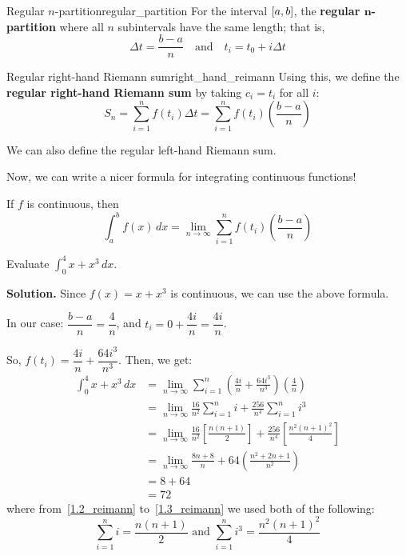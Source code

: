 \begin{Definition}{Regular $n$-partition}{regular_partition}
    For the interval $ \interval{a}{b} $, the \textbf{regular $ \bm{n} $-partition}
    where all $ n $ subintervals
    have the same length; that is,
    \[ \Delta t=\frac{b-a}{n} \quad\text{and}\quad  t_i=t_0+i\Delta t \]
\end{Definition}

\begin{Definition}{Regular right-hand Riemann sum}{right_hand_reimann}
    Using this, we define the \textbf{regular right-hand Riemann sum} by taking $ c_i=t_i $ for
    all $ i $:
    \[ S_n=\sum\limits_{i=1}^{n} f(t_i)\Delta t=\sum\limits_{i=1}^{n} f(t_i)\left(\frac{b-a}{n}\right) \]
\end{Definition}

\begin{Remark}{}{}
    We can also define the regular left-hand Riemann sum.
\end{Remark}

Now, we can write a nicer formula for integrating continuous functions!

If $ f $ is continuous, then
\[ \boxed{\int_{a}^{b} f(x)\, d{x} =
        \lim\limits_{{n} \to {\infty}} \sum\limits_{i=1}^{n} f(t_i)\left(\frac{b-a}{n}\right)} \]

\begin{Example}{}{}
    Evaluate
    $ \displaystyle\int_{0}^{4} x+x^3\, d{x} $.

    \textbf{Solution.}
    Since $ f(x)=x+x^3 $ is continuous, we can use the above formula.

    In our case: $ \dfrac{b-a}{n} = \dfrac{4}{n} $, and $ t_i = 0+\dfrac{4i}{n} = \dfrac{4i}{n} $.

    So, $ f(t_i) = \dfrac{4i}{n} + \dfrac{64i^3}{n^3} $.
    Then, we get:
    \begin{align}
        \int_{0}^{4} x+x^3\, d{x}
         & = \lim\limits_{{n} \to {\infty}} \sum\limits_{i=1}^{n}
        \left( \frac{4i}{n} +\frac{64i^3}{n^3} \right)\left( \frac{4}{n} \right)                  \\
         & = \lim\limits_{{n} \to {\infty}} \frac{16}{n^2} \sum\limits_{i=1}^{n} i +
        \frac{256}{n^4} \sum\limits_{i=1}^{n} i^3 \label{1.2_reimann}                             \\
         & = \lim\limits_{{n} \to {\infty}} \frac{16}{n^2} \left[ \frac{n(n+1)}{2} \right] +
        \frac{256}{n^4} \left[ \frac{n^2(n+1)^2}{4} \right] \label{1.3_reimann}                   \\
         & = \lim\limits_{{n} \to {\infty}} \frac{8n+8}{n} +64 \left(\frac{n^2+2n+1}{n^2} \right) \\
         & = 8+64                                                                                 \\
         & =72
    \end{align}
    where from~\ref{1.2_reimann} to~\ref{1.3_reimann} we used both of the following:
    \[ \sum\limits_{i=1}^{n} i=\frac{n(n+1)}{2} \text{ and }
        \sum\limits_{i=1}^{n} i^3=\frac{n^2(n+1)^2}{4} \]
\end{Example}

